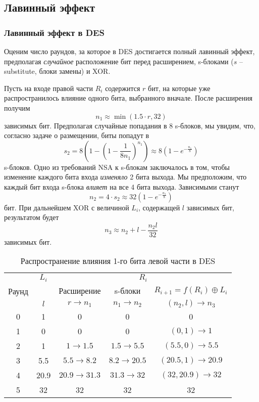 \subsection{Лавинный эффект}

\subsubsection{Лавинный эффект в DES}

Оценим число раундов, за которое в DES достигается полный лавинный эффект, предполагая \emph{случайное} расположение бит перед расширением, s-блоками ($s$ -- substitute, блоки замены) и XOR.

Пусть на входе правой части $R_i$ содержится $r$ бит, на которые уже распространилось влияние одного бита, выбранного вначале. После расширения получим
    \[ n_1 \approx \min(1.5 \cdot r, 32) \]
зависимых бит. Предполагая случайные попадания в 8 s-блоков, мы увидим, что, согласно задаче о размещении, биты попадут в
    \[ s_2 = 8 \left( 1 - \left( 1 - \frac{1}{{8}{n_1}} \right)^{n_1} \right) \approx 8 \left( 1 - e^{-\frac{n_1}{8}} \right) \]
s-блоков. Одно из требований NSA к s-блокам заключалось в том, чтобы изменение каждого бита входа \emph{изменяло} 2 бита выхода. Мы предположим, что каждый бит входа s-блока \emph{влияет} на все 4 бита выхода. Зависимыми станут
    \[ n_2 = 4 \cdot s_2 \approx 32 \left( 1 - e^{-\frac{n_1}{8}} \right) \]
бит. При дальнейшем XOR с величиной $L_i$, содержащей $l$ зависимых бит, результатом будет
    \[ n_3 \approx n_2 + l  - \frac{n_2 l}{32} \]
зависимых бит.

\begin{table}[!ht]
    \centering
    \caption{Распространение влияния 1-го бита левой части в DES\label{tab-DES-avalance-effect}}
    \begin{tabular}{||c||c||c|c|c||}
        \hline
        \multirow{3}{*}{Раунд} & $L_i$ & \multicolumn{3}{|c||}{$R_i$} \\
        \cline{2-5}
        & & Расширение & s-блоки & $R_{i+1} = f(R_i) \oplus L_i$ \\
        & $l$ & $r \rightarrow n_1$ & $n_1 \rightarrow n_2$ & $(n_2, l) \rightarrow n_3$ \\
        \hline \hline
        0 & 1 & 0 & 0 & 0 \\
        1 & 0 & 0 & 0 & $(0,1) \rightarrow 1$ \\
        2 & 1 & $1 \rightarrow 1.5$ & $1.5 \rightarrow 5.5$ & $(5.5, 0) \rightarrow 5.5$ \\
        3 & 5.5 & $5.5 \rightarrow 8.2$ & $8.2 \rightarrow 20.5$ & $(20.5, 1) \rightarrow 20.9$ \\
        4 & 20.9 & $20.9 \rightarrow 31.3$ & $31.3 \rightarrow 32$ & $(32, 20.9) \rightarrow 32$ \\
        5 & 32 & 32 & 32 & 32 \\
      \hline
    \end{tabular}
\end{table}

